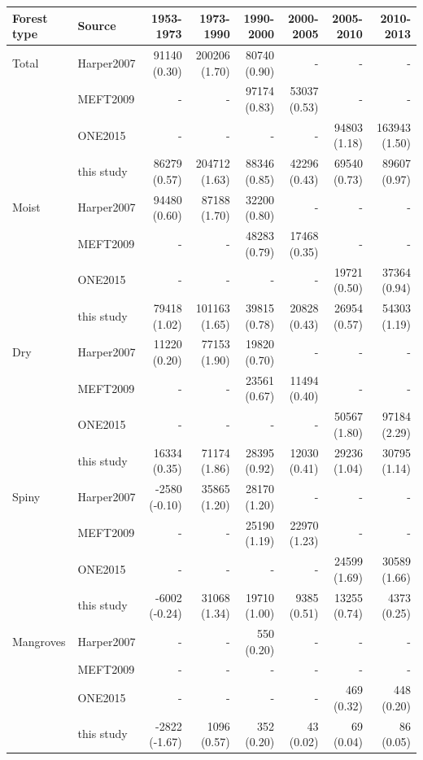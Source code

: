 \documentclass[a4paper, 12pt, leqno]{article} %
\begin{document}
\newpage

\begin{table}[!h]
  {\footnotesize
  \begin{longtable}[]{@{}llrrrrrr@{}}
    \toprule
    Forest type & Source & 1953-1973 & 1973-1990 & 1990-2000 & 2000-2005 &
    2005-2010 & 2010-2013\tabularnewline
    \midrule
    \endhead
    Total & Harper2007 & 91140 (0.30) & 200206 (1.70) & 80740 (0.90) & - & -
    & -\tabularnewline
    & MEFT2009 & - & - & 97174 (0.83) & 53037 (0.53) & - & -\tabularnewline
    & ONE2015 & - & - & - & - & 94803 (1.18) & 163943 (1.50)\tabularnewline
    & this study & 86279 (0.57) & 204712 (1.63) & 88346 (0.85) & 42296
    (0.43) & 69540 (0.73) & 89607 (0.97)\tabularnewline
    Moist & Harper2007 & 94480 (0.60) & 87188 (1.70) & 32200 (0.80) & - & -
    & -\tabularnewline
    & MEFT2009 & - & - & 48283 (0.79) & 17468 (0.35) & - & -\tabularnewline
    & ONE2015 & - & - & - & - & 19721 (0.50) & 37364 (0.94)\tabularnewline
    & this study & 79418 (1.02) & 101163 (1.65) & 39815 (0.78) & 20828
    (0.43) & 26954 (0.57) & 54303 (1.19)\tabularnewline
    Dry & Harper2007 & 11220 (0.20) & 77153 (1.90) & 19820 (0.70) & - & - &
    -\tabularnewline
    & MEFT2009 & - & - & 23561 (0.67) & 11494 (0.40) & - & -\tabularnewline
    & ONE2015 & - & - & - & - & 50567 (1.80) & 97184 (2.29)\tabularnewline
    & this study & 16334 (0.35) & 71174 (1.86) & 28395 (0.92) & 12030 (0.41)
    & 29236 (1.04) & 30795 (1.14)\tabularnewline
    Spiny & Harper2007 & -2580 (-0.10) & 35865 (1.20) & 28170 (1.20) & - & -
    & -\tabularnewline
    & MEFT2009 & - & - & 25190 (1.19) & 22970 (1.23) & - & -\tabularnewline
    & ONE2015 & - & - & - & - & 24599 (1.69) & 30589 (1.66)\tabularnewline
    & this study & -6002 (-0.24) & 31068 (1.34) & 19710 (1.00) & 9385 (0.51)
    & 13255 (0.74) & 4373 (0.25)\tabularnewline
    Mangroves & Harper2007 & - & - & 550 (0.20) & - & - & -\tabularnewline
    & MEFT2009 & - & - & - & - & - & -\tabularnewline
    & ONE2015 & - & - & - & - & 469 (0.32) & 448 (0.20)\tabularnewline
    & this study & -2822 (-1.67) & 1096 (0.57) & 352 (0.20) & 43 (0.02) & 69
    (0.04) & 86 (0.05)\tabularnewline
    \bottomrule
  \end{longtable}}
  \addtocounter{table}{-1}


\end{table}
\end{document}
